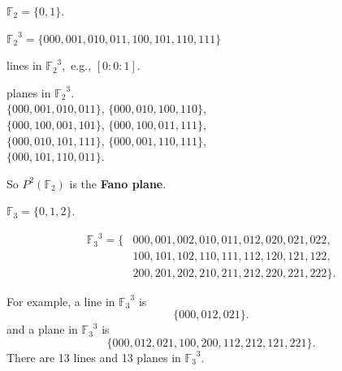 \documentclass[14pt]{chalkfjord}
\begin{document}
\begin{frame}
  $\mathbb{F}_2 = \{ 0, 1 \}$.

  \vfill\pause

  ${\mathbb{F}_2}^3 = \{ 000, 001, 010, 011, 100, 101, 110, 111 \}$

  \vfill{} lines in ${\mathbb{F}_2}^3$,\pause\ e.g., $[0:0:1]$.

  \vfill{} planes in ${\mathbb{F}_2}^3$. \\
  \quad $\{ 000, 001, 010, 011 \}$, $\{ 000, 010, 100, 110 \}$, \\
  \quad $\{ 000, 100, 001, 101 \}$, $\{ 000, 100, 011, 111 \}$, \\
  \quad $\{ 000, 010, 101, 111 \}$, $\{ 000, 001, 110, 111 \}$, \\
  \quad $\{ 000, 101, 110, 011 \}$.

  \vfill\pause

  So $P^2(\mathbb{F}_2)$ is the \textbf{Fano plane}.

\end{frame}


\begin{frame}
  $\mathbb{F}_3 = \{ 0, 1, 2 \}$.

  \vfill\pause

  \begin{align*}
  {\mathbb{F}_3}^3 = \{
  & 000, 001, 002,
  010, 011, 012,
  020, 021, 022, \\
  & 100, 101, 102,
  110, 111, 112,
  120, 121, 122, \\
  & 200, 201, 202,
  210, 211, 212,
  220, 221, 222 \}.
  \end{align*}

  \vfill\pause
  For example, a line in ${\mathbb{F}_3}^3$ is
  $$
  \{ 000, 012, 021 \}.
  $$
  and a plane in ${\mathbb{F}_3}^3$ is
  $$
  \{ 000, 012, 021, 100, 200, 112, 212, 121, 221 \}.
  $$
  \pause
  There are 13 lines and 13 planes in ${\mathbb{F}_3}^3$.

\end{frame}
\end{document}
